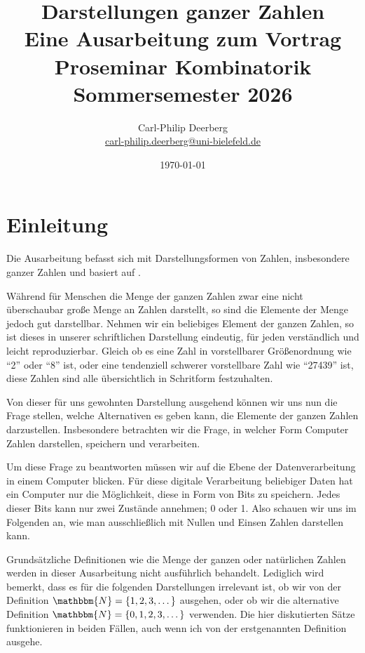 \documentclass{article}
\title{Darstellungen ganzer Zahlen \\ [0.5em] \Large Eine Ausarbeitung zum Vortrag \\ Proseminar Kombinatorik \\ Sommersemester 2026}
\date{\today}
\author{Carl-Philip Deerberg \\ \url{carl-philip.deerberg@uni-bielefeld.de}}
\newcommand{\N}{\mathbbm{N}} %
\begin{document}
\maketitle
\thispagestyle{empty}
\newpage

\tableofcontents
\newpage



\section{Einleitung}
  Die Ausarbeitung befasst sich mit Darstellungsformen von Zahlen, insbesondere ganzer Zahlen und basiert auf \cite{hougardy2018}. 
    
  \vspace{\baselineskip}

  Während für Menschen die Menge der ganzen Zahlen zwar eine nicht überschaubar große Menge an Zahlen darstellt, so sind die Elemente der Menge jedoch gut darstellbar.
  Nehmen wir ein beliebiges Element der ganzen Zahlen, so ist dieses in unserer schriftlichen Darstellung eindeutig, für jeden verständlich und leicht reproduzierbar.
  Gleich ob es eine Zahl in vorstellbarer Größenordnung wie ``2'' oder ``8'' ist, oder eine tendenziell schwerer vorstellbare Zahl wie ``27439'' ist, diese Zahlen sind alle übersichtlich in Schritform festzuhalten.
    
  Von dieser für uns gewohnten Darstellung ausgehend können wir uns nun die Frage stellen, welche Alternativen es geben kann, die Elemente der ganzen Zahlen darzustellen.
  Insbesondere betrachten wir die Frage, in welcher Form Computer Zahlen darstellen, speichern und verarbeiten.

  Um diese Frage zu beantworten müssen wir auf die Ebene der Datenverarbeitung in einem Computer blicken.
  Für diese digitale Verarbeitung beliebiger Daten hat ein Computer nur die Möglichkeit, diese in Form von Bits zu speichern.
  Jedes dieser Bits kann nur zwei Zustände annehmen; 0 oder 1. 
  Also schauen wir uns im Folgenden an, wie man ausschließlich mit Nullen und Einsen Zahlen darstellen kann.

  Grundsätzliche Definitionen wie die Menge der ganzen oder natürlichen Zahlen werden in dieser Ausarbeitung nicht ausführlich behandelt.
  Lediglich wird bemerkt, dass es für die folgenden Darstellungen irrelevant ist, ob wir von der Definition $\N = \{1, 2, 3, \dots\}$ ausgehen, oder ob wir die alternative Definition $\N = \{0, 1, 2, 3, \dots\}$ verwenden.
  Die hier diskutierten Sätze funktionieren in beiden Fällen, auch wenn ich von der erstgenannten Definition ausgehe.
\end{document}

